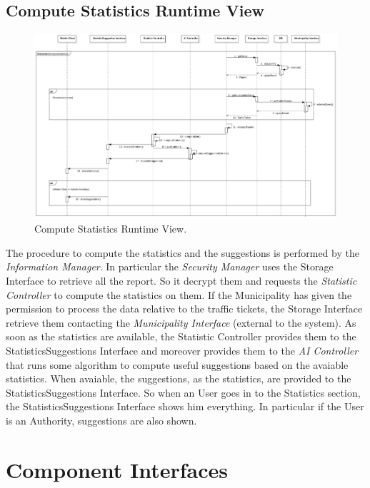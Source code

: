 \documentclass{report}
\begin{document}
\subsection{Compute Statistics Runtime View}
\begin{figure}[!ht]
	\begin{center}
	\includegraphics[width=\textwidth]{img/ComputeStatistics.png}
    \end{center}
    \label{fig:ComputeStatisticSD}
	\caption{Compute Statistics Runtime View.}
\end{figure}
The procedure to compute the statistics and the suggestions is performed by the \textit{Information Manager}. In particular the \textit{
Security Manager} uses the Storage Interface to retrieve all the report. So it decrypt them and requests the \textit{Statistic Controller} to compute the statistics on them. If the Municipality has given the permission to process the data relative to the traffic tickets, the Storage Interface retrieve them contacting the \textit{Municipality Interface} (external to the system). As soon as the statistics are available, the Statistic Controller provides them to the StatisticsSuggestions Interface and moreover provides them to the \textit{AI Controller} that runs some algorithm to compute useful suggestions based on the avaiable statistics.
When avaiable, the suggestions, as the statistics, are provided to the StatisticsSuggestions Interface. So when an User goes in to the Statistics section, the StatisticsSuggestions Interface shows him everything. 
In particular if the User is an Authority, suggestions are also shown.  


\section{Component Interfaces}
\end{document}
